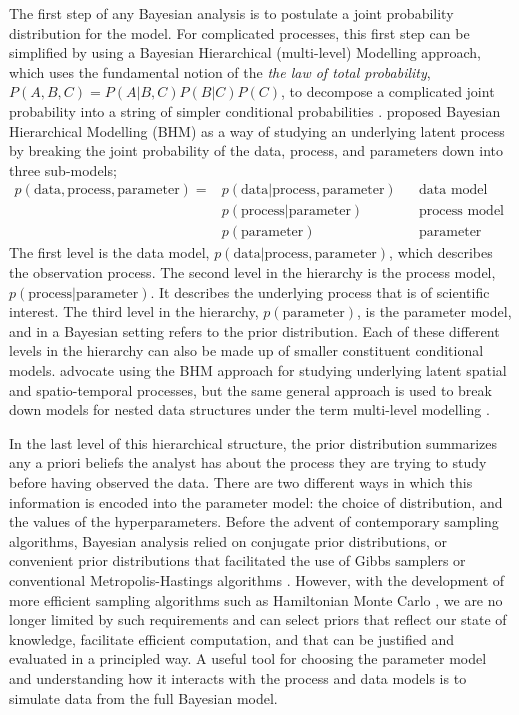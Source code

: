 The first step of any Bayesian analysis is to postulate a joint probability distribution for the model. For complicated processes, this first step can be simplified by using a Bayesian Hierarchical (multi-level) Modelling approach, which uses the fundamental notion of the \textit{the law of total probability}, $P(A, B, C) = P(A|B, C) P(B|C) P(C)$, to decompose a complicated joint probability into a string of simpler conditional probabilities \citep[p.~13]{wikle_2019}. \citet{Berliner_1996} proposed Bayesian Hierarchical Modelling (BHM) as a way of studying an underlying latent process by breaking the joint probability of the data, process, and parameters down into three sub-models;
\begin{align*}
  p(\text{data}, \text{process}, \text{parameter}) = & p(\text{data}| \text{process}, \text{parameter}) && \text{data model} \\
  & p(\text{process}| \text{parameter}) && \text{process model} \\
  & p(\text{parameter}) && \text{parameter model}
\end{align*}
The first level is the data model, $p(\text{data} | \text{process}, \text{parameter})$, which describes the observation process. The second level in the hierarchy is the process model, $p(\mbox{process} | \text{parameter})$. It describes the underlying process that is of scientific interest. The third level in the hierarchy, $p(\text{parameter})$, is the parameter model, and in a Bayesian setting refers to the prior distribution. Each of these different levels in the hierarchy can also be made up of smaller constituent conditional models. \citet{cressie_2011} advocate using the BHM approach for studying underlying latent spatial and spatio-temporal processes, but the same general approach is used to break down models for nested data structures under the term multi-level modelling \citep{BDA2020}. 

In the last level of this hierarchical structure, the prior distribution summarizes any a priori beliefs the analyst has about the process they are trying to study before having observed the data. There are two different ways in which this information is encoded into the parameter model: the choice of distribution, and the values of the hyperparameters. Before the advent of contemporary sampling algorithms, Bayesian analysis relied on conjugate prior distributions, or convenient prior distributions that facilitated the use of Gibbs samplers or conventional Metropolis-Hastings algorithms \citep{gilks_1996}. However, with the development of more efficient sampling algorithms such as Hamiltonian Monte Carlo \citep{betancourt_2017}, we are no longer limited by such requirements and can select priors that reflect our state of knowledge, facilitate efficient computation, and that can be justified and evaluated in a principled way. A useful tool for choosing the parameter model and understanding how it interacts with the process and data models is to simulate data from the full Bayesian model.

